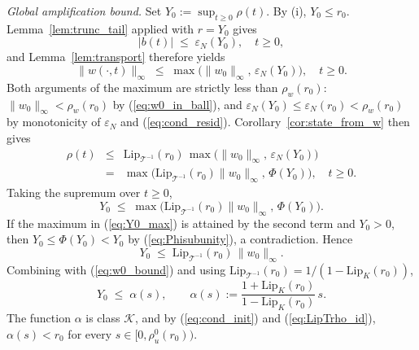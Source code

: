 \documentclass[10pt,a4paper]{amsart}
\newcommand{\Tcal}{\mathcal{T}}
\newcommand{\Lipk}{\mathrm{Lip}_K}
\newcommand{\LipT}{\mathrm{Lip}_{\Tcal^{-1}}}
\newcommand{\eps}{\varepsilon}
\begin{document}
\emph{Global amplification bound.} Set $Y_0 := \sup_{t \ge 0}\rho(t)$.
By (i), $Y_0 \le r_0$. Lemma~\ref{lem:trunc_tail} applied with $r = Y_0$ gives
\begin{equation}
|b(t)| \;\le\; \eps_N(Y_0), \quad t \ge 0,
\label{eq:b_bounded_Y0}
\end{equation}
and Lemma~\ref{lem:transport} therefore yields
\begin{equation}
\|w(\cdot,t)\|_\infty \;\le\; \max\bigl(\|w_0\|_\infty,\, \eps_N(Y_0)\bigr), \quad t \ge 0.
\label{eq:w_norm_Y0}
\end{equation}
Both arguments of the maximum are strictly less than $\rho_w(r_0)$: $\|w_0\|_\infty < \rho_w(r_0)$ by (\ref{eq:w0_in_ball}), and $\eps_N(Y_0) \le \eps_N(r_0) < \rho_w(r_0)$ by monotonicity of $\eps_N$ and (\ref{eq:cond_resid}). Corollary~\ref{cor:state_from_w} then gives
\begin{eqnarray}
\rho(t) &\le& \LipT(r_0)\,\max\bigl(\|w_0\|_\infty,\, \eps_N(Y_0)\bigr) \nonumber \\
&=& \max\bigl(\LipT(r_0)\|w_0\|_\infty,\, \Phi(Y_0)\bigr), \quad t \ge 0.
\label{eq:rho_max}
\end{eqnarray}
Taking the supremum over $t \ge 0$,
\begin{equation}
Y_0 \;\le\; \max\bigl(\LipT(r_0)\|w_0\|_\infty,\, \Phi(Y_0)\bigr).
\label{eq:Y0_max}
\end{equation}
If the maximum in (\ref{eq:Y0_max}) is attained by the second term and $Y_0 > 0$, then $Y_0 \le \Phi(Y_0) < Y_0$ by (\ref{eq:Phisubunity}), a contradiction. Hence
\begin{equation}
Y_0 \;\le\; \LipT(r_0)\,\|w_0\|_\infty.
\label{eq:Y0_linear}
\end{equation}
Combining with (\ref{eq:w0_bound}) and using $\LipT(r_0) = 1/(1 - \Lipk(r_0))$,
\begin{equation}
Y_0 \;\le\; \alpha(s), \qquad \alpha(s) := \frac{1 + \Lipk(r_0)}{1 - \Lipk(r_0)}\, s.
\label{eq:Y0_alpha}
\end{equation}
The function $\alpha$ is class $\mathcal{K}$, and by (\ref{eq:cond_init}) and (\ref{eq:LipTrho_id}), $\alpha(s) < r_0$ for every $s \in [0, \rho_u^0(r_0))$.
\end{document}
